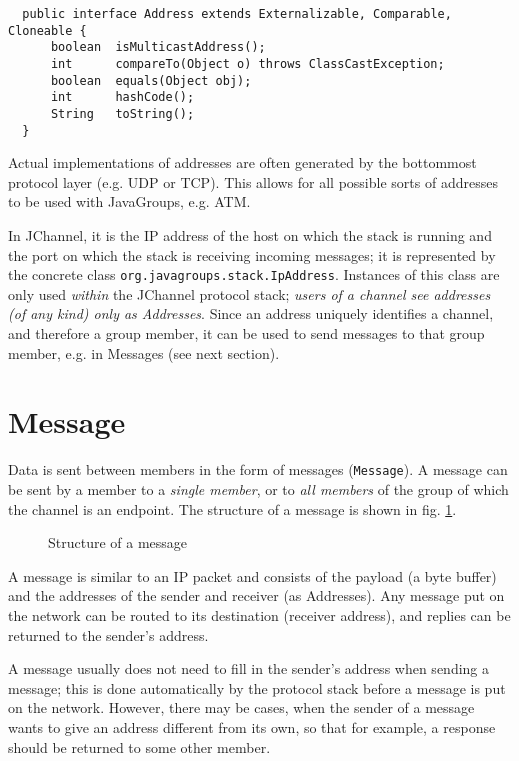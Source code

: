   \begin{small}
  \begin{verbatim}
  public interface Address extends Externalizable, Comparable, Cloneable {
      boolean  isMulticastAddress();
      int      compareTo(Object o) throws ClassCastException;
      boolean  equals(Object obj);
      int      hashCode();
      String   toString();
  }
  \end{verbatim}
  \end{small}
    
  Actual implementations of addresses are often generated by the bottommost protocol
  layer (e.g. UDP or TCP). This allows for all possible sorts of addresses to be used
  with JavaGroups, e.g. ATM.

  In JChannel, it is the IP address of the host on which the stack is running and
  the port on which the stack is receiving incoming messages; it is represented by
  the concrete class {\tt org.javagroups.stack.IpAddress}. Instances of this class
  are only used {\em within} the JChannel protocol stack; {\em users of a channel see
  addresses (of any kind) only as Addresses}. Since an address uniquely
  identifies a channel, and therefore a group member, it can be used to send
  messages to that group member, e.g. in Messages (see next section).




  \section{Message} \label{Messages}

  Data is sent between members in the form of messages ({\tt Message}). A message can
  be sent by a member to a {\em single member}, or to {\em all members} of the group
  of which the channel is an endpoint. The structure of a message is shown in
  fig. \ref{MessageFig}.

  \begin{figure}[htb]
       \caption{Structure of a message}
       \label{MessageFig}
  \end{figure}

  A message is similar to an IP packet and consists of the payload (a byte buffer)
  and the addresses of the sender and receiver (as Addresses). Any message put on the
  network can be routed to its destination (receiver address), and replies can be
  returned to the sender's address.

  A message usually does not need to fill in the sender's address when sending a
  message; this is done automatically by the protocol stack before a message is
  put on the network. However, there may be cases, when the sender of a message
  wants to give an address different from its own, so that for example, a response
  should be returned to some other member.


